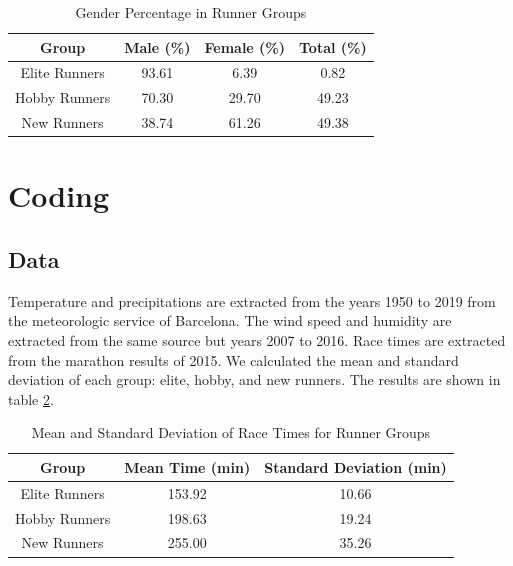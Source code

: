 \documentclass[conference]{IEEEtran}
\begin{document}
\begin{table}[htbp]
\caption{Gender Percentage in Runner Groups}
\begin{center}
\begin{tabular}{|c|c|c|c|}
\hline
\textbf{Group} & \textbf{Male (\%)} & \textbf{Female (\%)} & \textbf{Total (\%)} \\
\hline
Elite Runners & 93.61 & 6.39 & 0.82 \\
\hline
Hobby Runners & 70.30 & 29.70 & 49.23 \\
\hline
New Runners & 38.74 & 61.26 & 49.38 \\
\hline
\end{tabular}
\label{tab:gender_percentage}
\end{center}
\end{table}

\section{Coding}
\subsection{Data}
Temperature and precipitations are extracted from the years 1950 to 2019 from the meteorologic service of Barcelona. The wind speed and humidity are extracted from the same source but years 2007 to 2016.
Race times are extracted from the marathon results of 2015. We calculated the mean and standard deviation of each group: elite, hobby, and new runners. The results are shown in table \ref{tab:elite_hobby_new_mean_std_dev}.

\begin{table}[htbp]
\caption{Mean and Standard Deviation of Race Times for Runner Groups}
\begin{center}
\begin{tabular}{|c|c|c|}
\hline
\textbf{Group} & \textbf{Mean Time (min)} & \textbf{Standard Deviation (min)} \\
\hline
Elite Runners & 153.92 & 10.66 \\
\hline
Hobby Runners & 198.63 & 19.24 \\
\hline
New Runners & 255.00 & 35.26 \\
\hline
\end{tabular}
\label{tab:elite_hobby_new_mean_std_dev}
\end{center}
\end{table}
\end{document}
